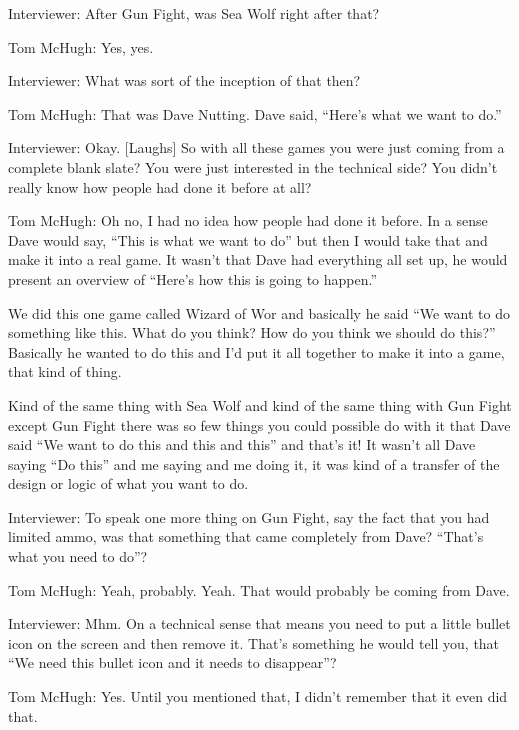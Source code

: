 \textcolor{interviewer}{Interviewer:} After Gun Fight, was Sea Wolf right after that?

\textcolor{interviewee}{Tom McHugh:} Yes, yes.

\textcolor{interviewer}{Interviewer:} What was sort of the inception of that then?

\textcolor{interviewee}{Tom McHugh:} That was Dave Nutting. Dave said, “Here’s what we want to do.”

\textcolor{interviewer}{Interviewer:} Okay. [Laughs] So with all these games you were just coming from a complete blank slate? You were just interested in the technical side? You didn’t really know how people had done it before at all?

\textcolor{interviewee}{Tom McHugh:} Oh no, I had no idea how people had done it before. In a sense Dave would say, “This is what we want to do” but then I would take that and make it into a real game. It wasn’t that Dave had everything all set up, he would present an overview of “Here’s how this is going to happen.” 

We did this one game called Wizard of Wor and basically he said “We want to do something like this. What do you think? How do you think we should do this?” Basically he wanted to do this and I’d put it all together to make it into a game, that kind of thing.

Kind of the same thing with Sea Wolf and kind of the same thing with Gun Fight except Gun Fight there was so few things you could possible do with it that Dave said “We want to do this and this and this” and that’s it! It wasn’t all Dave saying “Do this” and me saying and me doing it, it was kind of a transfer of the design or logic of what you want to do.

\textcolor{interviewer}{Interviewer:} To speak one more thing on Gun Fight, say the fact that you had limited ammo, was that something that came completely from Dave? “That’s what you need to do”?

\textcolor{interviewee}{Tom McHugh:} Yeah, probably. Yeah. That would probably be coming from Dave.

\textcolor{interviewer}{Interviewer:} Mhm. On a technical sense that means you need to put a little bullet icon on the screen and then remove it. That’s something he would tell you, that “We need this bullet icon and it needs to disappear”?

\textcolor{interviewee}{Tom McHugh:} Yes. Until you mentioned that, I didn’t remember that it even did that.

